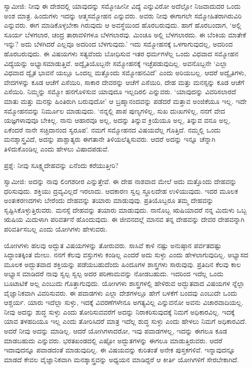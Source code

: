 ಸ್ವಾಮೀಜಿ: ನೀವು ಈ ದೇಶದಲ್ಲಿ ಯಾವುದನ್ನು ಸಮ್ಮೋಹೀನೀ ವಿದ್ಯೆ  ಎನ್ನುವಿರೋ ಅದೆಲ್ಲೋ ನಿಜವಾದುದರ ಒಂದು ಅಂಶ ಮಾತ್ರ. ಹಿಂದುಗಳು ಇದನ್ನು ಆತ್ಮಸಮ್ಮೋಹನ  ಎನ್ನುವರು. ಅವರು ನೀವು ಈಗಾಗಲೇ ಸಮ್ಮೋಹಿತರಾಗಿರುವಿರಿ ಎನ್ನುವರು. ಈಗ ಮಾಡಿಕೊಳ್ಳಬೇಕಾ ಗಿರುವುದು ಆ ಅವಸ್ಥೆಯಿಂದ ಹೊರಬರುವುದು. ಹಾಗೆ ಹೊರಬಂದಾಗ, ‘ಅಲ್ಲಿ ಸೂರ್ಯ ಬೆಳಗಲಾರ, ಚಂದ್ರ ತಾರಾವಳಿಗಳೂ ಬೆಳಗಲಾರವು. ಮಿಂಚೂ ಅಲ್ಲಿ ಬೆಳಗಲಾರದು. ಈ ಬೆಂಕಿಯ ಮಾತೇಕೆ ಇನ್ನು? ಅದು ಬೆಳಗಿದರೆ ಎಲ್ಲವೂ ಅದರಿಂದ ಬೆಳಗುವುದು.’ ಇದು ಸಮ್ಮೋಹನಕ್ಕೆ ಒಳಗಾಗುವುದಲ್ಲ, ಅದರಿಂದ ಹೊರಬರುವುದು. ಈ ವಿಷಯಗಳು ಸತ್ಯವೆಂದು ಬೋಧಿಸುವ ಇತರ ಧರ್ಮಗಳೆಲ್ಲ ಒಂದು ವಿಧವಾದ ಸಮ್ಮೋಹನ ವಿದ್ಯೆಯನ್ನು ಅಭ್ಯಾಸಮಾಡುತ್ತಿವೆ. ಅದ್ವೈತಿಯೊಬ್ಬನೇ ಸಮ್ಮೋಹನಕ್ಕೆ ಇಚ್ಛೆಪಡುವುದಿಲ್ಲ. ಅವನೊಬ್ಬನೇ ‘ಎಲ್ಲಾ ವಿಧವಾದ ದ್ವೈತ ಭಾವನೆ ಯಲ್ಲೂ ಒಂದಲ್ಲ ಮತ್ತೊಂದು ಸಮ್ಮೋಹನವಿದೆ’ ಎಂದು ಅರಿಯಬಲ್ಲ. ಆದರೆ ಅದ್ವೈತಿಗಳು, ವೇದಗಳನ್ನು ಕೂಡ ಆಚೆಗೆ ಎಸೆಯಿರಿ, ಸಾಕಾರ ದೇವರನ್ನು ಆಚೆಗೆ ಎಸೆಯಿರಿ, ದೇಹ ಮತ್ತು ಮನಸ್ಸನ್ನು ಕೂಡ ಆಚೆಗೆ ಎಸೆಯಿರಿ. ನಿಮ್ಮನ್ನು ಸಮ್ಮೋ ಹನಗೊಳಿಸುವ ಯಾವುದೂ ಇಲ್ಲದಿರಲಿ ಎನ್ನುವರು. ‘ಯಾವುದನ್ನು ವಿವರಿಸಲಾರದೆ ಮಾತು ಮತ್ತು ಮನಸ್ಸು ಹಿಂತಿರುಗಿ ಬರುವುದೋ’ ಆ ಬ್ರಹ್ಮಾನಂದವನ್ನು ಪಡೆದರೆ ಮತ್ತಾವ ಅಂಜಿಕೆಯೂ ಇಲ್ಲ. ಇದೇ ಸಮ್ಮೋಹನವನ್ನು ನಿರ್ಮೂಲ ಮಾಡುವುದು. ‘ನನ್ನಲ್ಲಿ ಪಾಪ ಪುಣ್ಯಗಳಿಲ್ಲ, ಸುಖ ದುಃಖಗಳಿಲ್ಲ, ನನಗೆ ವೇದ ಯಜ್ಞಗಳಾವುವೂ ಬೇಕಿಲ್ಲ. ನಾನು ಆಹಾರವೂ ಅಲ್ಲ, ಅದನ್ನು ತಿನ್ನುವ ಕ್ರಿಯೆಯೂ ಅಲ್ಲ, ತಿನ್ನುವ ವನೂ ಅಲ್ಲ, ಏಕೆಂದರೆ ನಾನೇ ಸಚ್ಚಿದಾನಂದ ಸ್ವರೂಪ’. ನಮಗೆ ಸಮ್ಮೋಹನದ ವಿಷಯವೆಲ್ಲ ಗೊತ್ತಿದೆ. ನಮ್ಮಲ್ಲಿ ಒಂದು ಮನಶ್ಶಾಸ್ತ್ರವಿದೆ, ಅದನ್ನು ಪಾಶ್ಚಾತ್ಯರು ಈಗತಾನೇ ತಿಳಿಯಲೆತ್ನಿಸುವರು. ಆದರೆ ಅದನ್ನು ಇನ್ನೂ ಚೆನ್ನಾಗಿ ತಿಳಿದುಕೊಂಡಿಲ್ಲ ಎಂದು ಹೇಳಲು ವಿಷಾದಪಡುವೆ.

ಪ್ರಶ್ನೆ: ನೀವು ಸೂಕ್ಷ್ಮದೇಹವನ್ನು ಏನೆಂದು ಕರೆಯುತ್ತೀರಿ?

ಸ್ವಾಮೀಜಿ: ಅದನ್ನು ನಾವು ಲಿಂಗಶರೀರ ಎನ್ನುತ್ತೇವೆ. ಈ ದೇಹ ನಾಶವಾದ ಮೇಲೆ ಅದು ಮತ್ತೊಂದು ದೇಹವನ್ನು ಧರಿಸುವುದು. ಶಕ್ತಿಯು ದ್ರವ್ಯವಿಲ್ಲದೆ ಇರಲಾದು. ಆದಕಾರಣ ಸ್ವಲ್ಪ ಸ್ಥೂಲದೇಹ ಉಳಿಯುವುದು. ಇದರ ಮೂಲಕ ಅಂತಃಕರಣದಗಳು ಬೇರೆಂದು ದೇಹವನ್ನು ತಯಾರು ಮಾಡುವುವು. ಪ್ರತಿಯೊಬ್ಬರೂ ತಮ್ಮ ದೇಹವನ್ನು ಸೃಷ್ಟಿಸಿಕೊಳ್ಳುತ್ತಿರುವರು. ಮನಸ್ಸೆ ದೇಹವನ್ನು ತಯಾರು ಮಾಡುವುದು. ನಾನೊಬ್ಬ ಋಷಿಯಾದರೆ ನನ್ನ ಮಿದುಳು ಒಬ್ಬ ಋಷಿಯ ಮಿದುಳಾಗಿ ಪರಿವರ್ತನೆ ಹೊಂದುವುದು. ಈ ಜೀವನದಲ್ಲೆ ಮಾನವ ತನ್ನ ದೇಹವನ್ನು ದೇವರ ದೇಹವನ್ನಾಗಿ ಪರಿವರ್ತಿಸಬಲ್ಲ ಎಂದು ಯೋಗಿಗಳು ಹೇಳುವರು.

ಯೋಗಿಗಳು ಹಲವು ಅದ್ಭುತ ವಿಷಯಗಳನ್ನು ತೋರುವರು. ಸಾಸಿವೆ ಕಾಳಿ ನಷ್ಟು ಅನುಷ್ಠಾನ ಪರ್ವತದಷ್ಟು ಸಿದ್ಧಾಂತಕ್ಕಿಂತ ಮೇಲು. ನನಗೆ ಕೆಲವು ವಸ್ತುಗಳು ಕಂಡಿಲ್ಲ ಎಂದರೆ ಅದು ಸುಳ್ಳು ಎಂದು ಹೇಳಲಾಗುವುದಿಲ್ಲ. ಅಭ್ಯಾಸದ ಮೂಲಕ ಅದ್ಭುತವಾದ ಶಕ್ತಿಯನ್ನು ಪಡೆಯಬಹುದೆಂದು ಹಿಂದೂಗಳ ಶಾಸ್ತ್ರಗಳು ಸಾರುವುವು. ಪ್ರತಿದಿನ ಕೆಲವು ಕಾಲ ಅಭ್ಯಾಸ ಮಾಡಿದರೆ ನಾವು ಸ್ವಲ್ಪ ಸ್ವಲ್ಪ ಅದರ ಪರಿಣಾಮವನ್ನು ನೋಡಬಹುದು. ಇದರಿಂದ ಇದೆಲ್ಲ ಒಂದು ಬೂಟಾಟಿಕೆ ಅಲ್ಲ ಎಂಬುದು ಗೊತ್ತಾಗುವುದು. ಯೋಗಿಗಳು ಶಾಸ್ತ್ರಗಳಲ್ಲಿ ಹೇಳಿರುವ ಅದ್ಭುತವಾದ ವಿಷಯಗಳ ನ್ನೆಲ್ಲಾ ವೈಜ್ಞಾನಿಕವಾಗಿ ವಿವರಿಸುವರು. ಈ ಪವಾಡಗಳು ಎಲ್ಲಾ ದೇಶಗಳಲ್ಲೂ ಹೇಗೆ ಬಳಕೆಗೆ ಬಂದವು ಎಂಬುದೇ ಒಂದು ಆಶ್ಚರ್ಯ. ಯಾರು ಇದೆಲ್ಲಾ ಸುಳ್ಳು, ಇದಕ್ಕೆ ವಿವರಣೆಗಳೇನೂ ಅಗತ್ಯವಿಲ್ಲ ಎನ್ನುವನೋ ಅವನು ವಿಚಾರವಾದಿಯಲ್ಲ. ನೀವು ಅದನ್ನು ಶುದ್ಧ ಸುಳ್ಳು ಎಂದು ತೋರಿಸುವವರೆಗೆ ಅದನ್ನು ನಿರಾಕರಿಸುವುದಕ್ಕೆ ನಿಮಗೆ ಅಧಿಕಾರವಿಲ್ಲ. ಇದಕ್ಕೆ ಯಾವ ತಳಹದಿಯೂ ಇಲ್ಲ ಎಂದು ತೋರಿಸಿದರೆ ಮಾತ್ರ ಇದೆಲ್ಲ ಶುದ್ಧ ಸುಳ್ಳು ಎಂದು ಹೇಳಲು ನಿಮಗೆ ಅಧಿಕಾರವಿದೆ. ಅದರೆ ನೀವು ಅದನ್ನು ಮಾಡಿಲ್ಲ. ಆದರೆ ಯೋಗಿಗಳಾದರೋ, ಇವು ಪವಾಡಗಳಲ್ಲ, ಇದನ್ನು ಈಗಲೂ ಕೂಡ ಮಾಡಬಹುದು ಎನ್ನುವರು. ಭರತಖಂಡದಲ್ಲಿ ಎಷ್ಟೋ ಅದ್ಭುತಗಳನ್ನು ಈಗಲೂ ಮಾಡುತ್ತಿರುವರು. ಆದರೆ ಇದಾವುದನ್ನೂ ಪವಾಡದಂತೆ ಮಾಡುವುದಿಲ್ಲ. ಈ ವಿಷಯವನ್ನು ಕುರಿತಂತೆ ಅನೇಕ ಪುಸ್ತಕಗಳಿವೆ. ಇನ್ನಾವುದನ್ನೂ ಮಾಡದೆ ಕೇವಲ ವೈಜ್ಞಾನಿಕವಾಗಿ ಮನಶ್ಶಾಸ್ತ್ರವನ್ನು ಅಧ್ಯಯನ ಮಾಡಿದ್ದರೆ ಆ ಕೀರ್ತಿ ಯೋಗಿಗಳಿಗೆ ಸೇರಬೇಕಾಗಿದೆ.

